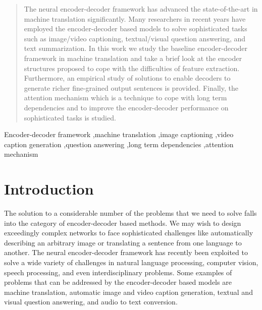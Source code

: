\documentclass[preprint, 12pt]{elsarticle}
\begin{document}
\begin{frontmatter}
\begin{abstract}
		The neural encoder-decoder framework has advanced the state-of-the-art in machine translation significantly. Many researchers in recent years have employed the encoder-decoder based models to solve sophisticated tasks such as image/video captioning,  textual/visual question answering, and text summarization. In this work we study the baseline encoder-decoder framework in machine translation and take a brief look at the encoder structures proposed to cope with the difficulties of feature extraction. Furthermore, an empirical study of solutions to enable decoders to generate richer fine-grained output sentences is provided. Finally, the attention mechanism which is a technique to cope with long term dependencies and to improve the encoder-decoder performance on sophisticated tasks is studied. 
		
		\end{abstract}
		
		\begin{keyword}
			
			
			Encoder-decoder framework \sep machine translation \sep image captioning \sep video caption generation \sep question answering \sep long term dependencies \sep attention mechanism	
		\end{keyword}
		
	\end{frontmatter}

	
	\section{Introduction}
	The solution to a considerable number of the problems that we need to solve falls into the category of encoder-decoder based methods. We may wish to design exceedingly complex networks to face sophisticated challenges like automatically describing an arbitrary image or translating a sentence from one language to another. The neural encoder-decoder framework has recently been exploited to solve a wide variety of challenges in natural language processing, computer vision, speech processing, and even interdisciplinary problems. Some examples of problems that can be addressed by the encoder-decoder based models are machine translation, automatic image and video caption generation, textual and visual question answering, and audio to text conversion.
	
\end{document}
